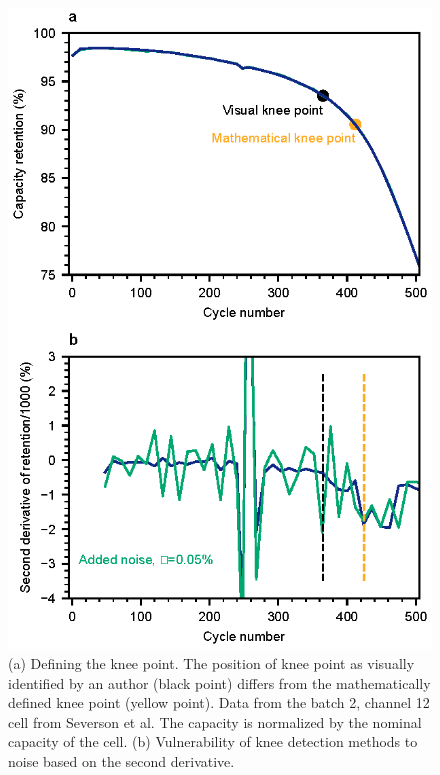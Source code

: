\documentclass[journal=jpclcd,manuscript=article]{achemso}
\begin{document}
\begin{figure}[!ht]
\centering
\includegraphics[scale=1]{figures/knee_definition.eps}
\caption{(a) Defining the knee point. The position of knee point as visually identified by an author (black point) differs from the mathematically defined knee point (yellow point). Data from the batch 2, channel 12 cell from Severson et al.\cite{severson_data-driven_2019} The capacity is normalized by the nominal capacity of the cell. (b) Vulnerability of knee detection methods to noise based on the second derivative.}
\label{fig:knee_definition3}
\end{figure}
\end{document}
